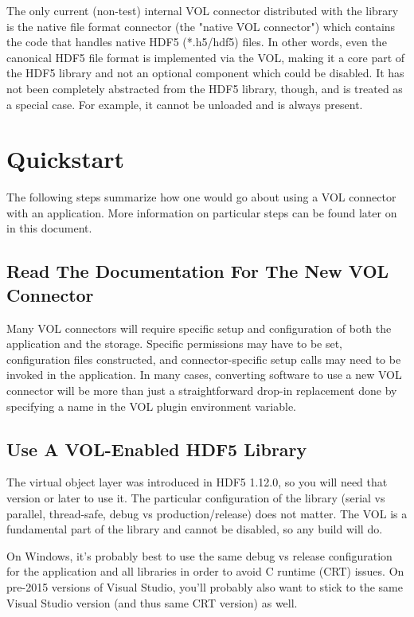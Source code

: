 The only current (non-test) internal VOL connector distributed with the library is the native file format connector (the "native VOL connector") which contains the code that handles native HDF5 (*.h5/hdf5) files. In other words, even the canonical HDF5 file format is implemented via the VOL, making it a core part of the HDF5 library and not an optional component which could be disabled. It has not been completely abstracted from the HDF5 library, though, and is treated as a special case. For example, it cannot be unloaded and is always present.


\section{Quickstart}

The following steps summarize how one would go about using a VOL connector with an application. More information on particular steps can be found later on in this document.

\subsection{Read The Documentation For The New VOL Connector}

Many VOL connectors will require specific setup and configuration of both the application and the storage. Specific permissions may have to be set, configuration files constructed, and connector-specific setup calls may need to be invoked in the application. In many cases, converting software to use a new VOL connector will be more than just a straightforward drop-in replacement done by specifying a name in the VOL plugin environment variable.

\subsection{Use A VOL-Enabled HDF5 Library}

The virtual object layer was introduced in HDF5 1.12.0, so you will need that version or later to use it. The particular configuration of the library (serial vs parallel, thread-safe, debug vs production/release) does not matter. The VOL is a fundamental part of the library and cannot be disabled, so any build will do.

On Windows, it's probably best to use the same debug vs release configuration for the application and all libraries in order to avoid C runtime (CRT) issues. On pre-2015 versions of Visual Studio, you'll probably also want to stick to the same Visual Studio version (and thus same CRT version) as well.

